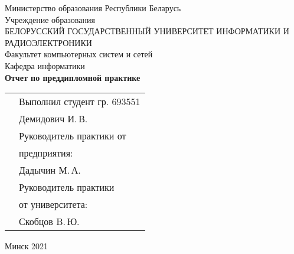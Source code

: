 \begin{titlepage}
    
    \begin{center}
        Министерство образования Республики Беларусь \\[0.4cm] 

        Учреждение образования \\

        \MakeUppercase{БЕЛОРУССКИЙ ГОСУДАРСТВЕННЫЙ УНИВЕРСИТЕТ ИНФОРМАТИКИ И РАДИОЭЛЕКТРОНИКИ} \\[0.4cm]

        Факультет компьютерных систем и сетей \\[0.4cm]

        Кафедра информатики \\[3.4cm] %

        {\large\bfseries{Отчет по преддипломной практике}} \\[2cm]

        \noindent
        \begin{tabular}{p{}p{}}
            & Выполнил студент гр. 693551 \\
            & Демидович И.\,В. \\[1cm]

            & Руководитель практики от \\
            & предприятия: \\
            & Дадычин М.\,А. \\[1cm]

            & Руководитель практики \\
            & от университета: \\
            & Скобцов B.\,Ю. \\
        \end{tabular}

        \vfill

        {\normalsize Минск 2021}
    \end{center}

\end{titlepage}

